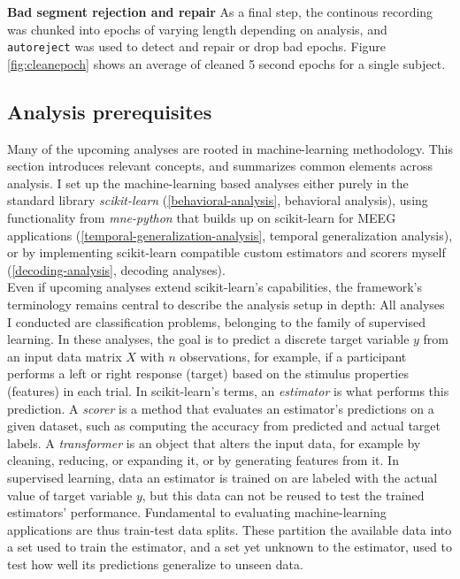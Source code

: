 \textbf{Bad segment rejection and repair} As a final step, the continous recording was chunked into epochs of varying length depending on analysis, and \texttt{autoreject} was used to detect and repair or drop bad epochs.
Figure \ref{fig:cleanepoch} shows an average of cleaned 5 second epochs for a single subject.



\subsection{Analysis prerequisites}
\label{decoding}

Many of the upcoming analyses are rooted in machine-learning methodology.
This section introduces relevant concepts, and summarizes common elements across analysis.
I set up the machine-learning based analyses either purely in the standard library \textit{scikit-learn} (\ref{behavioral-analysis}, behavioral analysis), using functionality from \textit{mne-python} that builds up on scikit-learn for MEEG applications (\ref{temporal-generalization-analysis}, temporal generalization analysis), or by implementing scikit-learn compatible custom estimators and scorers myself (\ref{decoding-analysis}, decoding analyses).\\
Even if upcoming analyses extend scikit-learn's capabilities, the framework's terminology remains central to describe the analysis setup in depth:
All analyses I conducted are classification problems, belonging to the family of supervised learning.
In these analyses, the goal is to predict a discrete target variable $y$ from an input data matrix $X$ with $n$ observations, for example, if a participant performs a left or right response (target) based on the stimulus properties (features) in each trial.
In scikit-learn's terms, an \textit{estimator} is what performs this prediction.
A \textit{scorer} is a method that evaluates an estimator's predictions on a given dataset, such as computing the accuracy from predicted and actual target labels.
A \textit{transformer} is an object that alters the input data, for example by cleaning, reducing, or expanding it, or by generating features from it.
In supervised learning, data an estimator is trained on are labeled with the actual value of target variable $y$, but this data can not be reused to test the trained estimators' performance.
Fundamental to evaluating machine-learning applications are thus train-test data splits.
These partition the available data into a set used to train the estimator, and a set yet unknown to the estimator, used to test how well its predictions generalize to unseen data.
